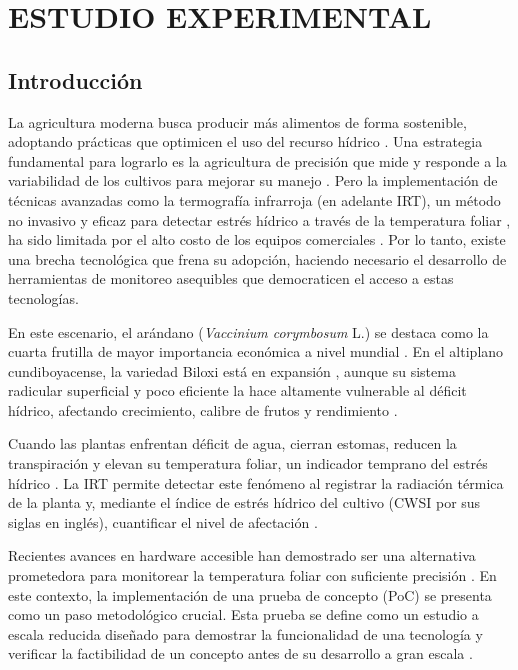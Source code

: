 \chapter{ESTUDIO EXPERIMENTAL}
\label{chap:estudio_experimental}

\section{Introducción}
\label{sec:exp_introduccion}

La agricultura moderna busca producir más alimentos de forma sostenible, adoptando prácticas que optimicen el uso del recurso hídrico . Una estrategia fundamental para lograrlo es la agricultura de precisión que mide y responde a la variabilidad de los cultivos para mejorar su manejo . Pero la implementación de técnicas avanzadas como la termografía infrarroja (en adelante IRT), un método no invasivo y eficaz para detectar estrés hídrico a través de la temperatura foliar , ha sido limitada por el alto costo de los equipos comerciales . Por lo tanto, existe una brecha tecnológica que frena su adopción, haciendo necesario el desarrollo de herramientas de monitoreo asequibles que democraticen el acceso a estas tecnologías.

En este escenario, el arándano (\textit{Vaccinium corymbosum} L.) se destaca como la cuarta frutilla de mayor importancia económica a nivel mundial . En el altiplano cundiboyacense, la variedad Biloxi está en expansión , aunque su sistema radicular superficial y poco eficiente la hace altamente vulnerable al déficit hídrico, afectando crecimiento, calibre de frutos y rendimiento .

Cuando las plantas enfrentan déficit de agua, cierran estomas, reducen la transpiración y elevan su temperatura foliar, un indicador temprano del estrés hídrico . La IRT permite detectar este fenómeno al registrar la radiación térmica de la planta y, mediante el índice de estrés hídrico del cultivo (CWSI por sus siglas en inglés), cuantificar el nivel de afectación .

Recientes avances en hardware accesible han demostrado ser una alternativa prometedora para monitorear la temperatura foliar con suficiente precisión . En este contexto, la implementación de una prueba de concepto (PoC) se presenta como un paso metodológico crucial. Esta prueba se define como un estudio a escala reducida diseñado para demostrar la funcionalidad de una tecnología y verificar la factibilidad de un concepto antes de su desarrollo a gran escala .

